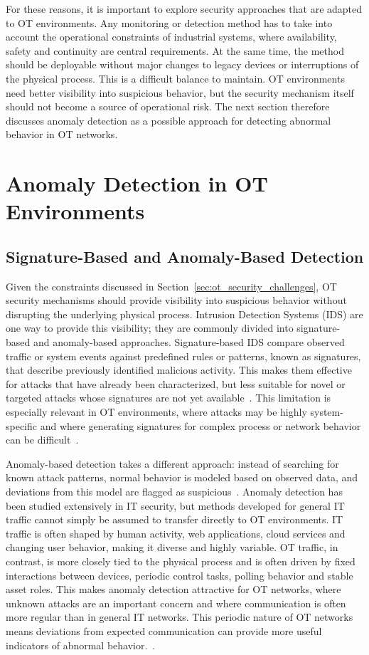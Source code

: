 For these reasons, it is important to explore security approaches that are adapted to OT environments. Any monitoring or detection method has to take into account the operational constraints of industrial systems, where availability, safety and continuity are central requirements. At the same time, the method should be deployable without major changes to legacy devices or interruptions of the physical process. This is a difficult balance to maintain. OT environments need better visibility into suspicious behavior, but the security mechanism itself should not become a source of operational risk. The next section therefore discusses anomaly detection as a possible approach for detecting abnormal behavior in OT networks.


\section{Anomaly Detection in OT Environments}
\subsection{Signature-Based and Anomaly-Based Detection}
Given the constraints discussed in Section~\ref{sec:ot_security_challenges}, OT security mechanisms should provide visibility into suspicious behavior without disrupting the underlying physical process. Intrusion Detection Systems (IDS) are one way to provide this visibility; they are commonly divided into signature-based and anomaly-based approaches. Signature-based IDS compare observed traffic or system events against predefined rules or patterns, known as signatures, that describe previously identified malicious activity. This makes them effective for attacks that have already been characterized, but less suitable for novel or targeted attacks whose signatures are not yet available~\cite{meira_performance_2020, jeffrey_hybrid_2024}. This limitation is especially relevant in OT environments, where attacks may be highly system-specific and where generating signatures for complex process or network behavior can be difficult~\cite{wang_guardians_2026}.

Anomaly-based detection takes a different approach: instead of searching for known attack patterns, normal behavior is modeled based on observed data, and deviations from this model are flagged as suspicious~\cite{abshari_survey_2025}. Anomaly detection has been studied extensively in IT security, but methods developed for general IT traffic cannot simply be assumed to transfer directly to OT environments. IT traffic is often shaped by human activity, web applications, cloud services and changing user behavior, making it diverse and highly variable. OT traffic, in contrast, is more closely tied to the physical process and is often driven by fixed interactions between devices, periodic control tasks, polling behavior and stable asset roles. This makes anomaly detection attractive for OT networks, where unknown attacks are an important concern and where communication is often more regular than in general IT networks. This periodic nature of OT networks means deviations from expected communication can provide more useful indicators of abnormal behavior.~\cite{meira_performance_2020, catillo_cps-guard_2023}. 


